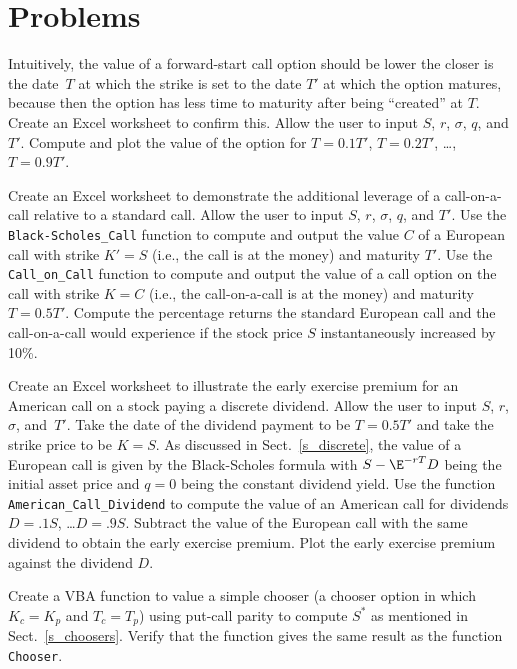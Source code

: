 \section*{Problems}
\begin{prob} Intuitively, the value of a forward-start call option should be lower the closer is the date~$T$ at which the strike is set to the date $T'$ at which the option matures, because then the option has less time to maturity after being ``created'' at $T$.  Create an Excel worksheet to confirm this.  Allow the user to input $S$, $r$, $\sigma$, $q$, and $T'$.  Compute and plot the value of the option for $T=0.1T'$, $T=0.2T'$, \ldots, $T=0.9T'$.
\end{prob}\begin{prob} Create an Excel worksheet to demonstrate the additional leverage of a call-on-a-call relative to a standard call.  Allow the user to input $S$, $r$, $\sigma$, $q$, and $T'$.  Use the \verb!Black-Scholes_Call! function to compute and output the value $C$ of a European call with strike $K'=S$ (i.e., the call is at the money) and maturity $T'$.  Use the \verb!Call_on_Call! function to compute and output the value of a call option on the call with strike $K=C$ (i.e., the call-on-a-call is at the money) and maturity $T=0.5T'$.  Compute the percentage returns the standard European call and the call-on-a-call would experience if the stock price $S$ instantaneously increased by 10\%.
\end{prob}\begin{prob} Create an Excel worksheet to illustrate the early exercise premium for an American call on a stock paying a discrete dividend.  Allow the user to input $S$, $r$, $\sigma$, and~$T'$.  Take the date of the dividend payment to be $T=0.5T'$ and take the strike price to be $K=S$.  As discussed in Sect.~\ref{s_discrete}, the value of a European call is given by the Black-Scholes formula with $S-\E^{-rT}D$ being the initial asset price and $q=0$ being the constant dividend yield.  Use the function \verb!American_Call_Dividend! to compute the value of an American call for dividends $D=.1S$, \ldots $D=.9S$.  Subtract the value of the European call with the same dividend to obtain the early exercise premium.  Plot the early exercise premium against the dividend $D$.
\end{prob}\begin{prob} Create a VBA function to value a simple chooser (a chooser option in which $K_c=K_p$ and $T_c=T_p$) using put-call parity to compute $S^*$ as mentioned in Sect.~\ref{s_choosers}.  Verify that the function gives the same result as the function \verb!Chooser!.

\end{prob}
